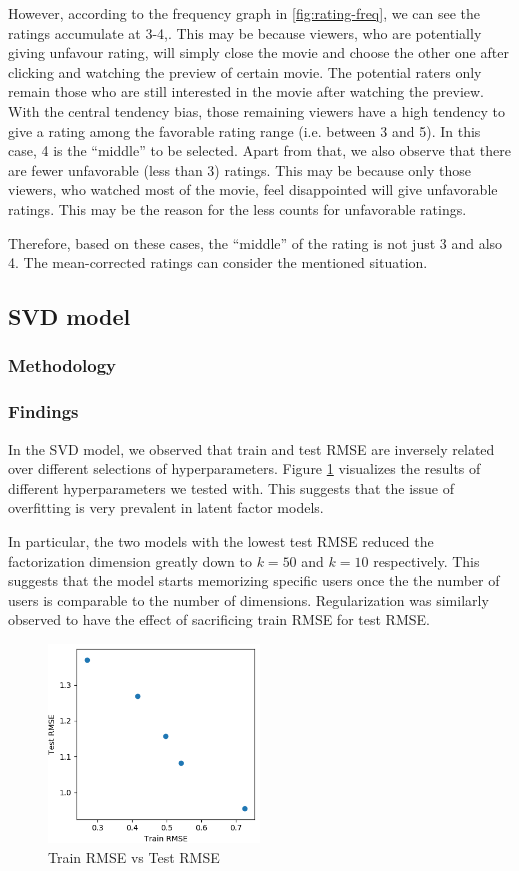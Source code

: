 \documentclass[final]{cvpr}
\begin{document}
However, according to the frequency graph in \ref{fig:rating-freq}, we can see the ratings accumulate at 3-4,.
This may be because viewers, who are potentially giving unfavour rating,
will simply close the movie and choose the other one after clicking and watching the preview of certain movie.
The potential raters only remain those who are still interested in the movie after watching the preview.
With the central tendency bias, those remaining viewers have a high tendency to give a rating among the favorable rating range (i.e. between 3 and 5).
In this case, 4 is the “middle” to be selected.
Apart from that, we also observe that there are fewer unfavorable (less than 3) ratings.
This may be because only those viewers, who watched most of the movie, feel disappointed will give unfavorable ratings.
This may be the reason for the less counts for unfavorable ratings.

Therefore, based on these cases, the “middle” of the rating is not just 3 and also 4.
The mean-corrected ratings can consider the mentioned situation.

\subsection{\ac{SVD} model}
\subsubsection{Methodology}


\subsubsection{Findings}
In the SVD model, we observed that train and test RMSE are inversely related
over different selections of hyperparameters.
Figure \ref{fig:svd-rmse-scatter} visualizes the results of different hyperparameters we tested with.
This suggests that the issue of overfitting is very prevalent in latent factor models.

In particular, the two models with the lowest test RMSE reduced the factorization dimension greatly
down to $k=50$ and $k=10$ respectively.
This suggests that the model starts memorizing specific users
once the the number of users is comparable to the number of dimensions.
Regularization was similarly observed to have the effect of sacrificing train RMSE for test RMSE.

\begin{figure}
	\includegraphics[width=0.5\textwidth]{screenshot20210422225123.png}
	\caption{Train RMSE vs Test RMSE}
	\label{fig:svd-rmse-scatter}
\end{figure}
\end{document}
